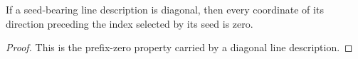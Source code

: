 \begin{lemma}
	\label{lem:line-description-prefix}
	\leanok
	If a seed-bearing line description is diagonal, then every coordinate of its
	direction preceding the index selected by its seed is zero.
\end{lemma}
\begin{proof}
	\leanok
	This is the prefix-zero property carried by a diagonal line description.
\end{proof}
